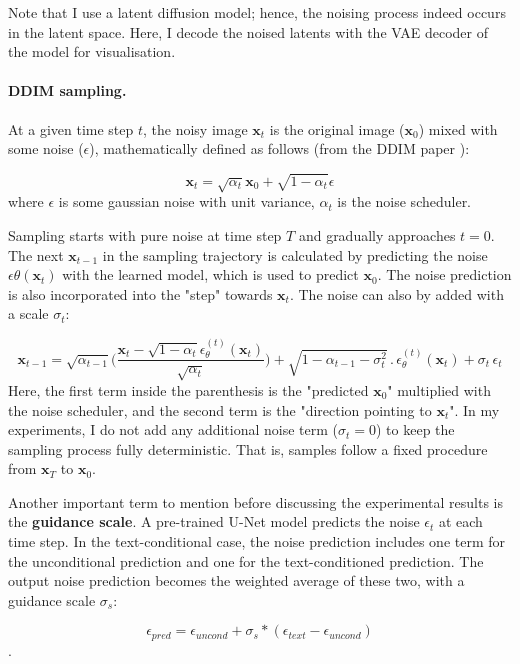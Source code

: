 Note that I use a latent diffusion model; hence, the noising process indeed occurs in the latent space. Here, I decode the noised latents with the VAE decoder of the model for visualisation. 

\paragraph{DDIM sampling.}
At a given time step $t$, the noisy image $\bm{x}_t$ is the original image ($\bm{x}_0$) mixed with some noise ($\epsilon$), mathematically defined as follows (from the DDIM paper \cite{song2020denoising}):

\begin{equation}
\bm{x}_t = \sqrt{\alpha_t}\bm{x}_0 + \sqrt{1 - \alpha_t}\epsilon
\end{equation}
where $\epsilon$ is some gaussian noise with unit variance, $\alpha_t$ is the noise scheduler. 

Sampling starts with pure noise at time step $T$ and gradually approaches $t = 0$. The next $\bm{x}_{t-1}$ in the sampling trajectory is calculated by predicting the noise $\epsilon\theta(\bm{x}_t)$ with the learned model, which is used to predict $\bm{x}_0$. The noise prediction is also incorporated into the "step" towards $\bm{x}_t$. The noise can also by added with a scale $\sigma_t$:

\begin{equation}
\bm{x}_{t -1} = \sqrt{\alpha_{t - 1}}\biggl(\frac{\bm{x}_t - \sqrt{1 - \alpha_t}\epsilon_{\theta}^{(t)}(\bm{x}_t)}{\sqrt{\alpha_t}}\biggl) + \sqrt{1 - \alpha_{t - 1} - \sigma_t^2} \, . \, \epsilon_{\theta}^{(t)}(\bm{x}_t) + \sigma_t \, \epsilon_t
\label{eq:ddim-sample}
\end{equation}
Here, the first term inside the parenthesis is the "predicted $\bm{x}_0$" multiplied with the noise scheduler, and the second term is the "direction pointing to $\bm{x}_t$". In my experiments, I do not add any additional noise term ($\sigma_t = 0$) to keep the sampling process fully deterministic. That is, samples follow a fixed procedure from $\bm{x}_T$ to $\bm{x}_0$.

Another important term to mention before discussing the experimental results is the \textbf{guidance scale}. A pre-trained U-Net model predicts the noise $\epsilon_t$ at each time step. In the text-conditional case, the noise prediction includes one term for the unconditional prediction and one for the text-conditioned prediction. The output noise prediction becomes the weighted average of these two, with a guidance scale $\sigma_s$:

$$\epsilon_{pred} = \epsilon_{uncond} + \sigma_s * (\epsilon_{text} - \epsilon_{uncond} )$$.

